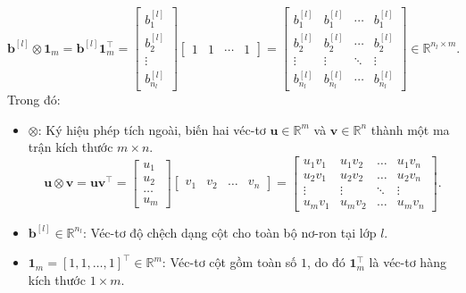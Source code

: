\begin{equation}
\mathbf{b}^{[l]} \otimes \mathbf{1}_m = \mathbf{b}^{[l]}\mathbf{1}_m^{\top} = \begin{bmatrix} b_1^{[l]} \\ b_2^{[l]} \\ \vdots \\ b_{n_l}^{[l]} \end{bmatrix} \begin{bmatrix} 1 & 1 & \cdots & 1 \end{bmatrix} = \begin{bmatrix} b_1^{[l]} & b_1^{[l]} & \cdots & b_1^{[l]} \\ b_2^{[l]} & b_2^{[l]} & \cdots & b_2^{[l]} \\ \vdots & \vdots & \ddots & \vdots \\ b_{n_l}^{[l]} & b_{n_l}^{[l]} & \cdots & b_{n_l}^{[l]} \end{bmatrix} \in \mathbb{R}^{n_l \times m}.
\label{eq:outer_product_bias}
\end{equation}
Trong đó:
\begin{itemize}
    \item $\otimes$: Ký hiệu phép tích ngoài, biến hai véc-tơ $\mathbf{u} \in \mathbb{R}^{m}$ và $\mathbf{v} \in \mathbb{R}^n$ thành một ma trận kích thước $m \times n$.
    \begin{equation}
        \mathbf{u} \otimes \mathbf{v} = \mathbf{u}\mathbf{v}^\top = 
        \begin{bmatrix}
            u_1 \\
            u_2 \\
            \dots \\
            u_m
        \end{bmatrix}
        \begin{bmatrix}
            v_1 & v_2 & \dots & v_n
        \end{bmatrix}
        = 
        \begin{bmatrix}
            u_1 v_1 & u_1 v_2 & \dots & u_1 v_n \\
            u_2 v_1 & u_2 v_2 & \dots & u_2 v_n \\
            \vdots  & \vdots  & \ddots & \vdots  \\
            u_m v_1 & u_m v_2 & \dots & u_m v_n
        \end{bmatrix}.
    \end{equation}

    \item $\mathbf{b}^{[l]} \in \mathbb{R}^{n_l}$: Véc-tơ độ chệch dạng cột cho toàn bộ nơ-ron tại lớp $l$.
    \item $\mathbf{1}_m = [1, 1, \dots, 1]^\top \in \mathbb{R}^m$: Véc-tơ cột gồm toàn số $1$, do đó $\mathbf{1}_m^\top$ là véc-tơ hàng kích thước $1 \times m$.
\end{itemize}

